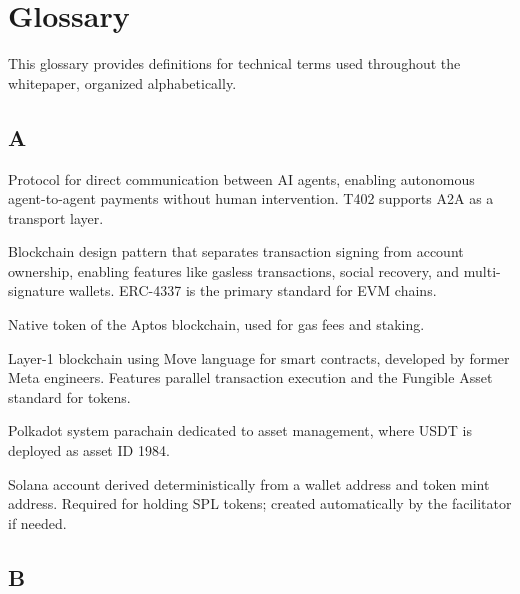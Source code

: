 \chapter{Glossary}
\label{app:glossary}

This glossary provides definitions for technical terms used throughout the \tprotocol{} whitepaper, organized alphabetically.

\section*{A}

\begin{description}[style=nextline]

\item[A2A (Agent-to-Agent)]
Protocol for direct communication between AI agents, enabling autonomous agent-to-agent payments without human intervention. T402 supports A2A as a transport layer.

\item[Account Abstraction]
Blockchain design pattern that separates transaction signing from account ownership, enabling features like gasless transactions, social recovery, and multi-signature wallets. ERC-4337 is the primary standard for EVM chains.

\item[APT]
Native token of the Aptos blockchain, used for gas fees and staking.

\item[Aptos]
Layer-1 blockchain using Move language for smart contracts, developed by former Meta engineers. Features parallel transaction execution and the Fungible Asset standard for tokens.

\item[Asset Hub]
Polkadot system parachain dedicated to asset management, where USDT is deployed as asset ID 1984.

\item[ATA (Associated Token Account)]
Solana account derived deterministically from a wallet address and token mint address. Required for holding SPL tokens; created automatically by the facilitator if needed.

\end{description}

\section*{B}

